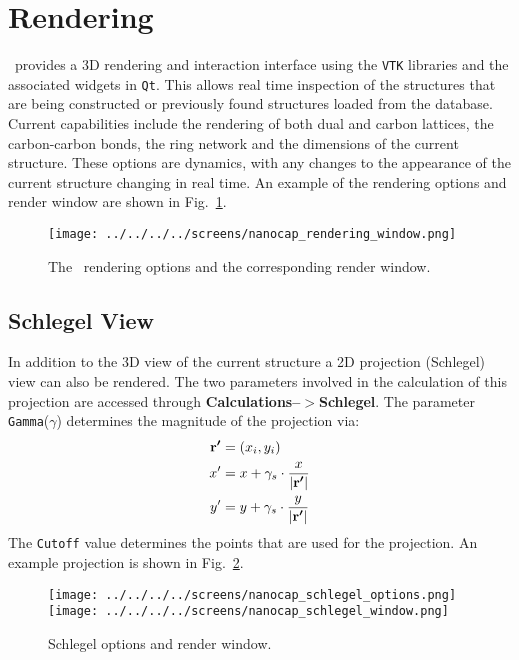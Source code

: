 \section{Rendering}\label{Rendering}

\nanocap~provides a 3D rendering and interaction interface using the \texttt{VTK} libraries and the associated widgets in \texttt{Qt}. This allows real time inspection of the structures that are being constructed or previously found structures loaded from the database. Current capabilities include the rendering of both dual and carbon lattices, the carbon-carbon bonds, the ring network and the dimensions of the current structure. These options are dynamics, with any changes to the appearance of the current structure changing in real time. An example of the \nanocap rendering options and render window are shown in Fig.~\ref{renderingwindow}.

 \begin{figure}[hp]
\centering
\texttt{[image: ../../../../screens/nanocap\_rendering\_window.png]}
\caption{The \nanocap~rendering options and the corresponding render window.}
\label{renderingwindow}
\end{figure}

\subsection{Schlegel View}

In addition to the 3D view of the current structure a 2D projection (Schlegel) view can also be rendered. The two parameters involved in the calculation of this projection are accessed through \textbf{Calculations--$>$Schlegel}. The parameter \texttt{Gamma}($\gamma$) determines the magnitude of the projection via:
\begin{equation*}
\begin{split}
\boldsymbol{\mathrm{r'}} &= (x_i,y_i)\\
x' &= x + \gamma_s\cdot \frac{x}{|\boldsymbol{\mathrm{r'}}|} \\
y' &= y + \gamma_s\cdot \frac{y}{|\boldsymbol{\mathrm{r'}}|} \\
\end{split}
\end{equation*}
The \texttt{Cutoff} value determines the points that are used for the projection. An example projection is shown in Fig.~\ref{schlegelrenderingwindow}.

 \begin{figure}[hp]
\centering
\texttt{[image: ../../../../screens/nanocap\_schlegel\_options.png]}
\texttt{[image: ../../../../screens/nanocap\_schlegel\_window.png]}
\caption{Schlegel options and render window.}
\label{schlegelrenderingwindow}
\end{figure}


